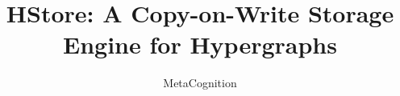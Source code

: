 \documentclass[sigconf,nonacm]{acmart}
\begin{document}
\title{HStore: A Copy-on-Write Storage Engine for Hypergraphs}

\author{MetaCognition}



\maketitle














\end{document}
